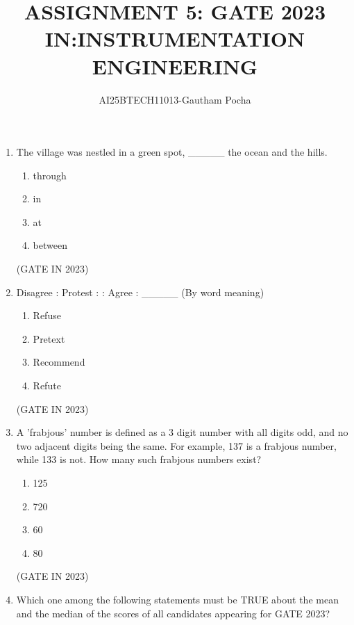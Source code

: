 \documentclass[journal]{IEEEtran}
\begin{document}
\title{
ASSIGNMENT 5: GATE 2023\\
IN:INSTRUMENTATION ENGINEERING}
\author{AI25BTECH11013-Gautham Pocha}
\maketitle
\renewcommand{\thefigure}{\theenumi}
\renewcommand{\thetable}{\theenumi}

\begin{enumerate}
    \item The village was nestled in a green spot, \_\_\_\_\_ the ocean and the hills.
    
    \begin{enumerate}
        \item through
        \item in
        \item at
        \item between
    \end{enumerate}
    \hfill(GATE IN 2023)

    \item Disagree : Protest : : Agree : \_\_\_\_\_ (By word meaning)
    
    \begin{enumerate}
        \item Refuse
        \item Pretext
        \item Recommend
        \item Refute
    \end{enumerate}
    \hfill(GATE IN 2023)

    \item A 'frabjous' number is defined as a 3 digit number with all digits odd, and no two adjacent digits being the same. For example, 137 is a frabjous number, while 133 is not. How many such frabjous numbers exist?
    
    \begin{enumerate}
        \item 125
        \item 720
        \item 60
        \item 80
    \end{enumerate}
    \hfill(GATE IN 2023)

    \item Which one among the following statements must be TRUE about the mean and the median of the scores of all candidates appearing for GATE 2023?
    

\end{enumerate}
\end{document}
